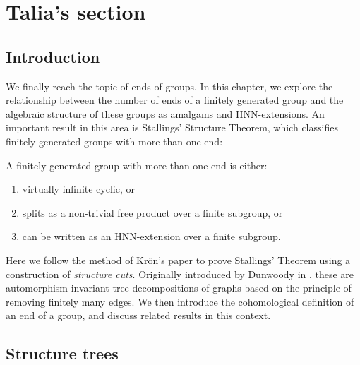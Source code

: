 \newpage %
\section{Talia's section}


\subsection{Introduction}

We finally reach the topic of ends of groups. In this chapter, we explore the relationship between the number of ends of a finitely generated group and the algebraic structure of these groups as amalgams and HNN-extensions. An important result in this area is Stallings’ Structure Theorem, which classifies finitely generated groups with more than one end:

\begin{theorem}
A finitely generated group with more than one end is either:
    \begin{enumerate}
        \item virtually infinite cyclic, or
        \item splits as a non-trivial free product over a finite subgroup, or
        \item can be written as an HNN-extension over a finite subgroup.
    \end{enumerate}
\end{theorem}


Here we follow the method of Kr{\"o}n's paper \cite{K10} to prove Stallings' Theorem using a construction of \emph{structure cuts}. Originally introduced by Dunwoody in \cite{D79}, these are automorphism invariant tree-decompositions of graphs based on the principle of removing finitely many edges. %
We then introduce the cohomological definition of an end of a group, and discuss related results in this context. %

\subsection{Structure trees}
 

